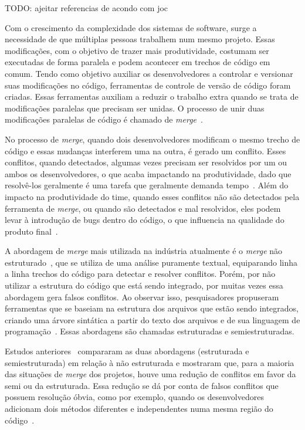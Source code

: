 
TODO: ajeitar referencias de acondo com joc

Com o crescimento da complexidade dos sistemas de software, surge a necessidade
de que múltiplas pessoas trabalhem num mesmo projeto. Essas modificações, com o
objetivo de trazer mais produtividade, costumam ser executadas de forma paralela e podem acontecer em
trechos de código em comum. Tendo como objetivo auxiliar os desenvolvedores a
controlar e versionar suas modificações no código, ferramentas de controle de versão de
código foram criadas. Essas ferramentas auxiliam a reduzir o trabalho extra quando se trata de
modificações paralelas que precisam ser unidas. O processo de unir duas modificações
paralelas de código é chamado de \emph{merge}~\cite{mens02}.

No processo de \emph{merge}, quando dois desenvolvedores modificam o mesmo trecho de
código e essas mudanças interferem uma na outra, é gerado um conflito. Esses conflitos,
quando detectados, algumas vezes precisam ser resolvidos por um ou ambos os desenvolvedores, o
que acaba impactando na produtividade, dado que resolvê-los geralmente é uma tarefa que geralmente demanda tempo~\cite{brun11}.
Além do impacto na produtividade do time, quando esses conflitos
não são detectados pela ferramenta de \emph{merge}, ou quando são detectados e mal resolvidos, eles
podem levar à introdução de bugs dentro do código, o que influencia na qualidade do produto final~\cite{brin20}.

A abordagem de \emph{merge} mais utilizada na indústria atualmente é o \emph{merge} não estruturado~\cite{khan07},
que se utiliza de uma análise puramente textual, equiparando linha a linha trechos do código
para detectar e resolver conflitos. Porém, por não utilizar a estrutura do código que está sendo
integrado, por muitas vezes essa abordagem gera falsos conflitos. Ao observar isso, pesquisadores
propuseram ferramentas que se baseiam na estrutura dos arquivos que estão sendo integrados, criando
uma árvore sintática a partir do texto dos arquivos e de sua linguagem de programação~\cite{apel11}.
Essas abordagens são chamadas estruturadas e semiestruturadas.

Estudos anteriores~\cite{apel11,cavalcanti15,cavalcanti19} compararam as duas abordagens (estruturada e semiestruturada)
em relação à não estruturada e mostraram que, para a maioria das situações de \emph{merge} dos projetos,
houve uma redução de conflitos em favor da semi ou da estruturada. Essa redução se dá por conta
de falsos conflitos que possuem resolução óbvia, como por exemplo, quando os desenvolvedores adicionam
dois métodos diferentes e independentes numa mesma região do código~\cite{cavalcanti17}.

